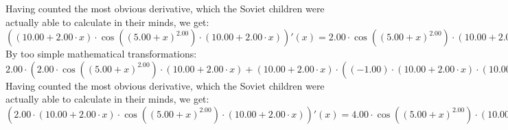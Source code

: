 \documentclass{article}
\begin{document}
 \newline
 \newline 
Having counted the most obvious derivative, which the Soviet children were actually able to calculate in their minds, we get:
$({\left({{10.00} + {{2.00} \cdot {x}}}\right) \cdot { \cos {\left({\left({{5.00} + {x}}\right) ^ {2.00}}\right)}  \cdot \left({{10.00} + {{2.00} \cdot {x}}}\right)}})'(x) = {{{2.00} \cdot { \cos {\left({\left({{5.00} + {x}}\right) ^ {2.00}}\right)}  \cdot \left({{10.00} + {{2.00} \cdot {x}}}\right)}} + {\left({{10.00} + {{2.00} \cdot {x}}}\right) \cdot \left({{\left({-1.00}\right) \cdot {\left({{10.00} + {{2.00} \cdot {x}}}\right) \cdot {\left({{10.00} + {{2.00} \cdot {x}}}\right) \cdot  \sin {\left({\left({{5.00} + {x}}\right) ^ {2.00}}\right)} }}} + {{2.00} \cdot  \cos {\left({\left({{5.00} + {x}}\right) ^ {2.00}}\right)} }}\right)}}$\newline
\newline
By too simple mathematical transformations:
 ${{2.00} \cdot \left({{{2.00} \cdot { \cos {\left({\left({{5.00} + {x}}\right) ^ {2.00}}\right)}  \cdot \left({{10.00} + {{2.00} \cdot {x}}}\right)}} + {\left({{10.00} + {{2.00} \cdot {x}}}\right) \cdot \left({{\left({-1.00}\right) \cdot {\left({{10.00} + {{2.00} \cdot {x}}}\right) \cdot {\left({{10.00} + {{2.00} \cdot {x}}}\right) \cdot  \sin {\left({\left({{5.00} + {x}}\right) ^ {2.00}}\right)} }}} + {{2.00} \cdot  \cos {\left({\left({{5.00} + {x}}\right) ^ {2.00}}\right)} }}\right)}}\right)} = {{{4.00} \cdot { \cos {\left({\left({{5.00} + {x}}\right) ^ {2.00}}\right)}  \cdot \left({{10.00} + {{2.00} \cdot {x}}}\right)}} + {{2.00} \cdot {\left({{10.00} + {{2.00} \cdot {x}}}\right) \cdot \left({{\left({-1.00}\right) \cdot {\left({{10.00} + {{2.00} \cdot {x}}}\right) \cdot {\left({{10.00} + {{2.00} \cdot {x}}}\right) \cdot  \sin {\left({\left({{5.00} + {x}}\right) ^ {2.00}}\right)} }}} + {{2.00} \cdot  \cos {\left({\left({{5.00} + {x}}\right) ^ {2.00}}\right)} }}\right)}}}$ 
 \newline
 \newline 
Having counted the most obvious derivative, which the Soviet children were actually able to calculate in their minds, we get:
$({{2.00} \cdot {\left({{10.00} + {{2.00} \cdot {x}}}\right) \cdot { \cos {\left({\left({{5.00} + {x}}\right) ^ {2.00}}\right)}  \cdot \left({{10.00} + {{2.00} \cdot {x}}}\right)}}})'(x) = {{{4.00} \cdot { \cos {\left({\left({{5.00} + {x}}\right) ^ {2.00}}\right)}  \cdot \left({{10.00} + {{2.00} \cdot {x}}}\right)}} + {{2.00} \cdot {\left({{10.00} + {{2.00} \cdot {x}}}\right) \cdot \left({{\left({-1.00}\right) \cdot {\left({{10.00} + {{2.00} \cdot {x}}}\right) \cdot {\left({{10.00} + {{2.00} \cdot {x}}}\right) \cdot  \sin {\left({\left({{5.00} + {x}}\right) ^ {2.00}}\right)} }}} + {{2.00} \cdot  \cos {\left({\left({{5.00} + {x}}\right) ^ {2.00}}\right)} }}\right)}}}$\newline
\end{document}
